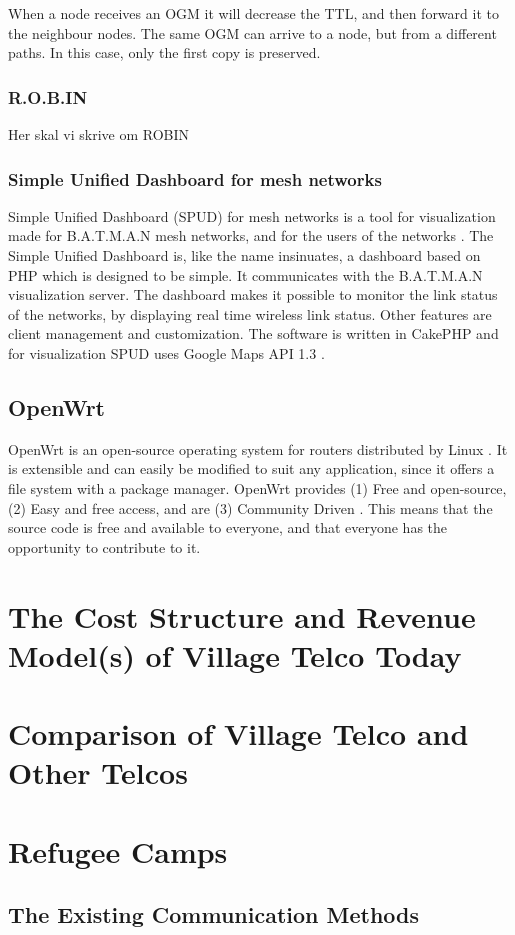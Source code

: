 When a node receives an OGM it will decrease the TTL, and then forward it to the neighbour nodes. The same OGM can arrive to a node, but from a different paths. In this case, only the first copy is preserved. 

\subsubsection{R.O.B.IN}
Her skal vi skrive om ROBIN

\subsubsection{Simple Unified Dashboard for mesh networks}
Simple Unified Dashboard (SPUD) for mesh networks is a tool for visualization made for B.A.T.M.A.N mesh networks, and for the users of the networks \cite{spud}. The Simple Unified Dashboard is, like the name insinuates, a dashboard based on PHP which is designed to be simple. It communicates with the B.A.T.M.A.N visualization server. The dashboard makes it possible to monitor the link status of the networks, by displaying real time wireless link status. Other features are client management and customization. The software is written in CakePHP and for visualization SPUD uses Google Maps API 1.3 \cite{spud}.


\subsection{OpenWrt}
OpenWrt is an open-source operating system for routers distributed by Linux \cite{openwrt}. It is extensible and can easily be modified to suit any application, since it offers a file system with a package manager. OpenWrt provides (1) Free and open-source, (2) Easy and free access, and are (3) Community Driven \cite{openwrt}. This means that the source code is free and available to everyone, and that everyone has the opportunity to contribute to it. 


\section{The Cost Structure and Revenue Model(s) of Village Telco Today}

\section{Comparison of Village Telco and Other Telcos}

\section{Refugee Camps}
\subsection{The Existing Communication Methods}